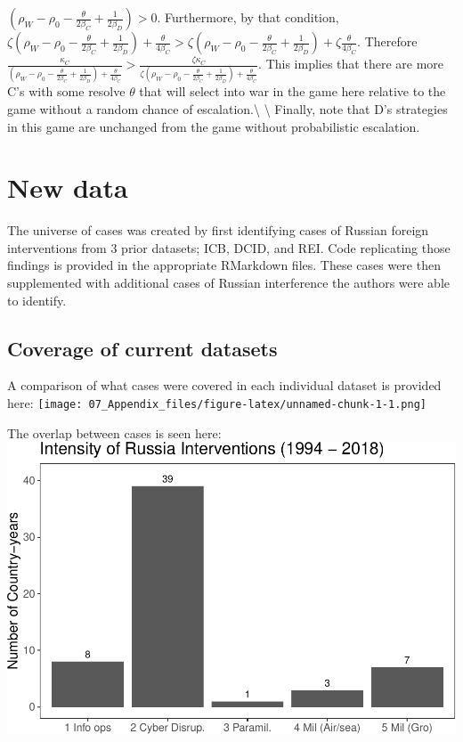 \documentclass[
]{article}
\begin{document}
\(\left(\rho_{W}-\rho_{0}-\frac{\theta}{2\beta_{C}}+\frac{1}{2\beta_{D}}\right)>0\).
Furthermore, by that condition,
\(\zeta\left(\rho_{W}-\rho_{0}-\frac{\theta}{2\beta_{C}}+\frac{1}{2\beta_{D}}\right)+\frac{\theta}{4\beta_{C}}>\zeta\left(\rho_{W}-\rho_{0}-\frac{\theta}{2\beta_{C}}+\frac{1}{2\beta_{D}}\right)+\zeta\frac{\theta}{4\beta_{C}}\).
Therefore
\(\frac{\kappa_{C}}{\left(\rho_{W}-\rho_{0}-\frac{\theta}{2\beta_{C}}+\frac{1}{2\beta_{D}}\right)+\frac{\theta}{4\beta_{C}}}>\frac{\zeta\kappa_{C}}{\zeta\left(\rho_{W}-\rho_{0}-\frac{\theta}{2\beta_{C}}+\frac{1}{2\beta_{D}}\right)+\frac{\theta}{4\beta_{C}}}\).
This implies that there are more C's with some resolve \(\theta\) that
will select into war in the game here relative to the game without a
random chance of escalation.\textbackslash{} \textbackslash{} Finally,
note that D's strategies in this game are unchanged from the game
without probabilistic escalation.

\hypertarget{new-data}{%
\section{New data}\label{new-data}}

The universe of cases was created by first identifying cases of Russian
foreign interventions from 3 prior datasets; ICB, DCID, and REI. Code
replicating those findings is provided in the appropriate RMarkdown
files. These cases were then supplemented with additional cases of
Russian interference the authors were able to identify.

\hypertarget{coverage-of-current-datasets}{%
\subsection{Coverage of current
datasets}\label{coverage-of-current-datasets}}

A comparison of what cases were covered in each individual dataset is
provided here:
\texttt{[image: 07\_Appendix\_files/figure-latex/unnamed-chunk-1-1.png]}

The overlap between cases is seen here:
\includegraphics{07_Appendix_files/figure-latex/unnamed-chunk-2-1.pdf}
\end{document}
